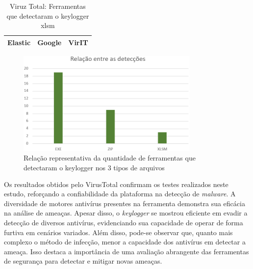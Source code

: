 \documentclass[12pt]{article}
\begin{document}
\begin{table}[H]
    \centering
    \begin{tabular}{|c|c|c|}
        \hline
        Elastic                & Google                & VirIT                 \\ 
        \hline
    \end{tabular}
    \caption{Viruz Total: Ferramentas que detectaram o keylogger xlsm}
\end{table}


\begin{figure}[H]
    \centering
    \includegraphics[width=0.8\textwidth]{imgs/image.png} %
    \caption{Relação representativa da quantidade de ferramentas que detectaram o keylogger nos 3 tipos de arquivos}
\end{figure}
Os resultados obtidos pelo VirusTotal confirmam os testes realizados neste estudo, reforçando a confiabilidade da plataforma na detecção de \textit{malware}. A diversidade de motores antivírus presentes na ferramenta demonstra sua eficácia na análise de ameaças. Apesar disso, o \textit{keylogger} se mostrou eficiente em evadir a detecção de diversos antivírus, evidenciando sua capacidade de operar de forma furtiva em cenários variados. Além disso, pode-se observar que, quanto mais complexo o método de infecção, menor a capacidade dos antivírus em detectar a ameaça. Isso destaca a importância de uma avaliação abrangente das ferramentas de segurança para detectar e mitigar novas ameaças.
\end{document}
